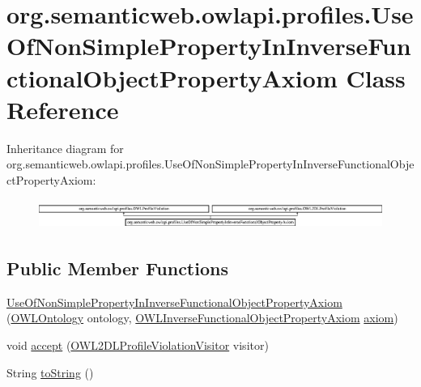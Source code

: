 \hypertarget{classorg_1_1semanticweb_1_1owlapi_1_1profiles_1_1_use_of_non_simple_property_in_inverse_functional_object_property_axiom}{\section{org.\-semanticweb.\-owlapi.\-profiles.\-Use\-Of\-Non\-Simple\-Property\-In\-Inverse\-Functional\-Object\-Property\-Axiom Class Reference}
\label{classorg_1_1semanticweb_1_1owlapi_1_1profiles_1_1_use_of_non_simple_property_in_inverse_functional_object_property_axiom}
}
Inheritance diagram for org.\-semanticweb.\-owlapi.\-profiles.\-Use\-Of\-Non\-Simple\-Property\-In\-Inverse\-Functional\-Object\-Property\-Axiom\-:\begin{figure}[H]
\begin{center}
\leavevmode
\includegraphics[height=0.965517cm]{classorg_1_1semanticweb_1_1owlapi_1_1profiles_1_1_use_of_non_simple_property_in_inverse_functional_object_property_axiom}
\end{center}
\end{figure}
\subsection*{Public Member Functions}
\begin{DoxyCompactItemize}
\item 
\hyperlink{classorg_1_1semanticweb_1_1owlapi_1_1profiles_1_1_use_of_non_simple_property_in_inverse_functional_object_property_axiom_a7df2dd55d6da01ff427822a5e8cd1d95}{Use\-Of\-Non\-Simple\-Property\-In\-Inverse\-Functional\-Object\-Property\-Axiom} (\hyperlink{interfaceorg_1_1semanticweb_1_1owlapi_1_1model_1_1_o_w_l_ontology}{O\-W\-L\-Ontology} ontology, \hyperlink{interfaceorg_1_1semanticweb_1_1owlapi_1_1model_1_1_o_w_l_inverse_functional_object_property_axiom}{O\-W\-L\-Inverse\-Functional\-Object\-Property\-Axiom} \hyperlink{classorg_1_1semanticweb_1_1owlapi_1_1profiles_1_1_o_w_l_profile_violation_aa7c8e8910ed3966f64a2c003fb516214}{axiom})
\item 
void \hyperlink{classorg_1_1semanticweb_1_1owlapi_1_1profiles_1_1_use_of_non_simple_property_in_inverse_functional_object_property_axiom_a40a16878f2e61c275ab5d8037691d4e1}{accept} (\hyperlink{interfaceorg_1_1semanticweb_1_1owlapi_1_1profiles_1_1_o_w_l2_d_l_profile_violation_visitor}{O\-W\-L2\-D\-L\-Profile\-Violation\-Visitor} visitor)
\item 
String \hyperlink{classorg_1_1semanticweb_1_1owlapi_1_1profiles_1_1_use_of_non_simple_property_in_inverse_functional_object_property_axiom_a8885e93305f92e5ddcdcd93d7ba9a73e}{to\-String} ()
\end{DoxyCompactItemize}


